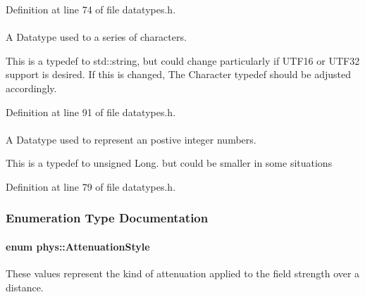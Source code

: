 Definition at line 74 of file datatypes.h.

\hypertarget{namespacephys_aa03900411993de7fbfec4789bc1d392e}{
\paragraph[{String}]{}\hfill}
\label{df/dec/namespacephys_aa03900411993de7fbfec4789bc1d392e}


A Datatype used to a series of characters. 

This is a typedef to std::string, but could change particularly if UTF16 or UTF32 support is desired. If this is changed, The Character typedef should be adjusted accordingly. 

Definition at line 91 of file datatypes.h.

\hypertarget{namespacephys_a460f6bc24c8dd347b05e0366ae34f34a}{
\paragraph[{Whole}]{}\hfill}
\label{df/dec/namespacephys_a460f6bc24c8dd347b05e0366ae34f34a}


A Datatype used to represent an postive integer numbers. 

This is a typedef to unsigned Long. but could be smaller in some situations 

Definition at line 79 of file datatypes.h.



\subsubsection{Enumeration Type Documentation}
\hypertarget{namespacephys_ad4ce7ee5c1cc164f2ea3d5f28211739f}{
\paragraph[{AttenuationStyle}]{\setlength{\rightskip}{0pt plus 5cm}enum {\bf phys::AttenuationStyle}}\hfill}
\label{df/dec/namespacephys_ad4ce7ee5c1cc164f2ea3d5f28211739f}


These values represent the kind of attenuation applied to the field strength over a distance. 

